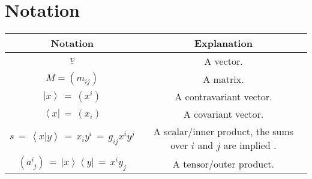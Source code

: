 %
%

\chapter{Notation}

\begin{tabular}{|c|c|}
\hline
\bf{Notation} & \bf{Explanation} \tabularnewline
\hline
$ \underline{v} $ & A vector. \tabularnewline
\hline
$ M = \left( m_{ij} \right) $ & A matrix. \tabularnewline
\hline
$\left| x \right> \,=\, \left( x^i \right) $ & A contravariant vector. \tabularnewline
\hline
$\left< x \right| \,=\, \left( x_i \right) $ & A covariant vector. \tabularnewline
\hline
$s \,=\, \left< x | y \right> \,=\, x_i y^i \,=\, g_{ij} x^i y^j $ & A scalar/inner product, the sums over $i$ and $j$ are implied \cite{wiki_summation}. \tabularnewline
\hline
$\left(a^{i}_{\;j}\right) \,=\, \left| x \right> \left< y \right| \,=\, x^i y_j$ & A tensor/outer product. \tabularnewline
\hline
\end{tabular}
